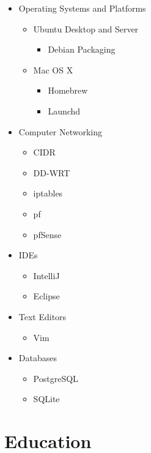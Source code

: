 \documentclass[10pt,a4paper]{article}
\begin{document}
\begin{itemize}
    \item Operating Systems and Platforms
        \begin{itemize}
            \item Ubuntu Desktop and Server
                \begin{itemize}
                    \item Debian Packaging
                \end{itemize}
            \item Mac OS X
                \begin{itemize}
                    \item Homebrew
                    \item Launchd
                \end{itemize}
        \end{itemize}
    \item Computer Networking
        \begin{itemize}
            \item CIDR
            \item DD-WRT
            \item iptables
            \item pf
            \item pfSense
            \end{itemize}
    \item IDEs
        \begin{itemize}
            \item IntelliJ
            \item Eclipse
        \end{itemize}
    \item Text Editors
        \begin{itemize}
            \item Vim
        \end{itemize}
    \item Databases
        \begin{itemize}
            \item PostgreSQL
            \item SQLite
        \end{itemize}

\end {itemize}

\section*{Education}
\end{document}
